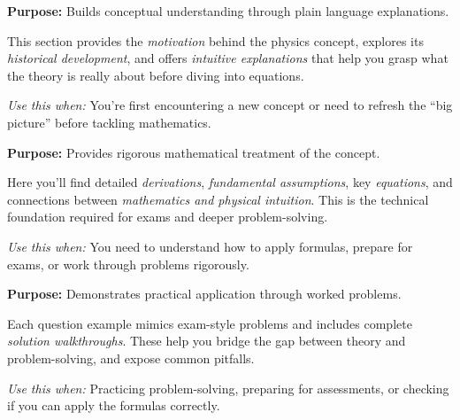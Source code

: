 \noindent
\begin{minipage}{0.9\textwidth}
  \begin{tcolorbox}[breakable, colback=GoldBG, colframe=StarGold,
                     leftrule=4pt, arc=0pt,
                     before upper={\textcolor{StarGold}{\textbf{\scshape Physics Intuition}}\par\smallskip}]
    \textbf{Purpose:} Builds conceptual understanding through plain language explanations.

    This section provides the \emph{motivation} behind the physics concept,
    explores its \emph{historical development}, and offers \emph{intuitive explanations}
    that help you grasp what the theory is really about before diving into equations.

    \smallskip
    \textit{Use this when:} You're first encountering a new concept or need to refresh
    the ``big picture'' before tackling mathematics.
  \end{tcolorbox}
\end{minipage}

\bigskip

\noindent
\begin{minipage}{0.9\textwidth}
  \begin{tcolorbox}[breakable, colback=TealBG, colframe=NebulaTeal,
                     leftrule=4pt, arc=0pt,
                     before upper={\textcolor{NebulaTeal}{\textbf{\scshape Theory}}\par\smallskip}]
    \textbf{Purpose:} Provides rigorous mathematical treatment of the concept.

    Here you'll find detailed \emph{derivations}, \emph{fundamental assumptions},
    key \emph{equations}, and connections between \emph{mathematics and physical intuition}.
    This is the technical foundation required for exams and deeper problem-solving.

    \smallskip
    \textit{Use this when:} You need to understand how to apply formulas, prepare for exams,
    or work through problems rigorously.
  \end{tcolorbox}
\end{minipage}

\bigskip

\noindent
\begin{minipage}{0.9\textwidth}
  \begin{tcolorbox}[breakable, colback=GreenBG, colframe=ForestGreen,
                     arc=3pt,
                     before upper={\textcolor{ForestGreen}{\textbf{\scshape Question Examples}}\par\smallskip}]
    \textbf{Purpose:} Demonstrates practical application through worked problems.

    Each question example mimics exam-style problems and includes complete
    \emph{solution walkthroughs}. These help you bridge the gap between theory
    and problem-solving, and expose common pitfalls.

    \smallskip
    \textit{Use this when:} Practicing problem-solving, preparing for assessments,
    or checking if you can apply the formulas correctly.
  \end{tcolorbox}
\end{minipage}

